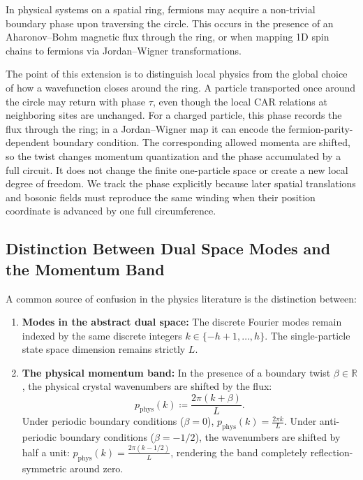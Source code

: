 In physical systems on a spatial ring, fermions may acquire a non-trivial boundary phase upon traversing the circle. This occurs in the presence of an Aharonov--Bohm magnetic flux through the ring, or when mapping 1D spin chains to fermions via Jordan--Wigner transformations.

The point of this extension is to distinguish local physics from the global
choice of how a wavefunction closes around the ring. A particle transported
once around the circle may return with phase $\tau$, even though the local
CAR relations at neighboring sites are unchanged. For a charged particle,
this phase records the flux through the ring; in a Jordan--Wigner map it
can encode the fermion-parity-dependent boundary condition. The corresponding
allowed momenta are shifted, so the twist changes momentum quantization and
the phase accumulated by a full circuit. It does not change the finite
one-particle space or create a new local degree of freedom. We track the
phase explicitly because later spatial translations and bosonic fields
must reproduce the same winding when their position coordinate is advanced
by one full circumference.

\subsection{Distinction Between Dual Space Modes and the Momentum Band}

A common source of confusion in the physics literature is the distinction between:
\begin{enumerate}
    \item \textbf{Modes in the abstract dual space:} The discrete Fourier modes remain indexed by the same discrete integers $k \in \{-h+1, \dots, h\}$. The single-particle state space dimension remains strictly $L$.
    \item \textbf{The physical momentum band:} In the presence of a boundary twist $\beta \in \mathbb{R}$, the physical crystal wavenumbers are shifted by the flux:
    \begin{equation}
    p_{\mathrm{phys}}(k) \coloneqq \frac{2\pi (k + \beta)}{L}.
    \end{equation}
    Under periodic boundary conditions ($\beta = 0$), $p_{\mathrm{phys}}(k) = \frac{2\pi k}{L}$. Under anti-periodic boundary conditions ($\beta = -1/2$), the wavenumbers are shifted by half a unit: $p_{\mathrm{phys}}(k) = \frac{2\pi (k - 1/2)}{L}$, rendering the band completely reflection-symmetric around zero.
\end{enumerate}

